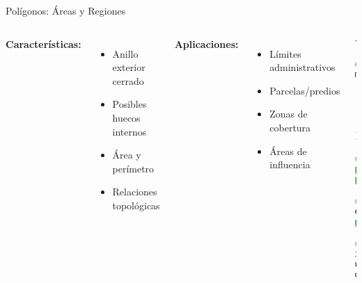 \documentclass[10pt]{beamer}
\begin{document}
\begin{frame}[fragile]{Polígonos: Áreas y Regiones}
    \begin{columns}
        \textbf{Características:}
        \begin{itemize}
            \item Anillo exterior cerrado
            \item Posibles huecos internos
            \item Área y perímetro
            \item Relaciones topológicas
        \end{itemize}
        
        \textbf{Aplicaciones:}
        \begin{itemize}
            \item Límites administrativos
            \item Parcelas/predios
            \item Zonas de cobertura
            \item Áreas de influencia
        \end{itemize}
        
        \begin{lstlisting}[language=Python, caption=Polígonos y análisis]
from shapely.geometry import Polygon

# Crear polígono
manzana = Polygon([
    (-70.650, -33.440),
    (-70.648, -33.440),
    (-70.648, -33.438),
    (-70.650, -33.438),
    (-70.650, -33.440)
])

# Propiedades geométricas
print(f"Área: {manzana.area}")
print(f"Perímetro: {manzana.length}")

# Operaciones espaciales
edificio = Point(-70.649, -33.439)
print(manzana.contains(edificio))  # True

# Overlay de polígonos
interseccion = poligono1.intersection(poligono2)
union = poligono1.union(poligono2)
diferencia = poligono1.difference(poligono2)
        \end{lstlisting}
    \end{columns}
\end{frame}
\end{document}
